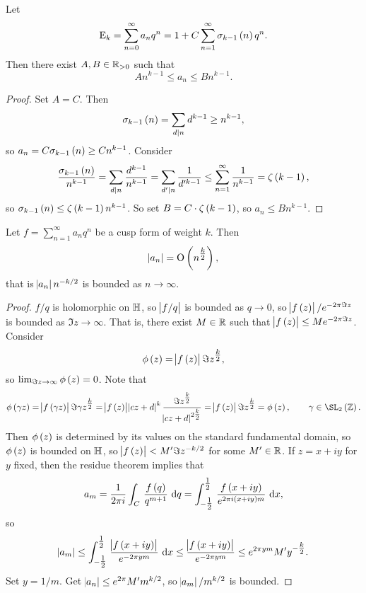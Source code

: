 \begin{proposition}
Let
$$ \E_k = \sum_{n = 0}^\infty a_nq^n = 1 + C\sum_{n = 1}^\infty \sigma_{k - 1}\br{n}q^n. $$
Then there exist $ A, B \in \mathbb{R}_{> 0} $ such that
$$ An^{k - 1} \le a_n \le Bn^{k - 1}. $$
\end{proposition}

\begin{proof}
Set $ A = C $. Then
$$ \sigma_{k - 1}\br{n} = \sum_{d \mid n} d^{k - 1} \ge n^{k - 1}, $$
so $ a_n = C\sigma_{k - 1}\br{n} \ge Cn^{k - 1} $. Consider
$$ \dfrac{\sigma_{k - 1}\br{n}}{n^{k - 1}} = \sum_{d \mid n} \dfrac{d^{k - 1}}{n^{k - 1}} = \sum_{d' \mid n} \dfrac{1}{d'^{k - 1}} \le \sum_{n = 1}^\infty \dfrac{1}{n^{k - 1}} = \zeta\br{k - 1}, $$
so $ \sigma_{k - 1}\br{n} \le \zeta\br{k - 1}n^{k - 1} $. So set $ B = C \cdot \zeta\br{k - 1} $, so $ a_n \le Bn^{k - 1} $.
\end{proof}

\begin{theorem}[Hasse]
Let $ f = \sum_{n = 1}^\infty a_nq^n $ be a cusp form of weight $ k $. Then
$$ \abs{a_n} = \O\br{n^{\tfrac{k}{2}}}, $$
that is $ \abs{a_n}n^{-k / 2} $ is bounded as $ n \to \infty $.
\end{theorem}

\pagebreak

\begin{proof}
$ f / q $ is holomorphic on $ \mathbb{H} $, so $ \abs{f / q} $ is bounded as $ q \to 0 $, so $ \abs{f\br{z}} / e^{-2\pi \Im z} $ is bounded as $ \Im z \to \infty $. That is, there exist $ M \in \mathbb{R} $ such that $ \abs{f\br{z}} \le Me^{-2\pi \Im z} $. Consider
$$ \phi\br{z} = \abs{f\br{z}}\Im z^{\tfrac{k}{2}}, $$
so $ \lim_{\Im z \to \infty} \phi\br{z} = 0 $. Note that
$$ \phi\br{\gamma z} = \abs{f\br{\gamma z}}\Im \gamma z^{\tfrac{k}{2}} = \abs{f\br{z}}\abs{cz + d}^k\dfrac{\Im z^{\tfrac{k}{2}}}{\abs{cz + d}^{2\tfrac{k}{2}}} = \abs{f\br{z}}\Im z^{\tfrac{k}{2}} = \phi\br{z}, \qquad \gamma \in \SL_2\br{\ZZ}. $$
Then $ \phi\br{z} $ is determined by its values on the standard fundamental domain, so $ \phi\br{z} $ is bounded on $ \mathbb{H} $, so $ \abs{f\br{z}} < M'\Im z^{-k / 2} $ for some $ M' \in \mathbb{R} $. If $ z = x + iy $ for $ y $ fixed, then the residue theorem implies that
$$ a_m = \dfrac{1}{2\pi i}\intd{C}{}{\dfrac{f\br{q}}{q^{m + 1}}}{q} = \intd{-\tfrac{1}{2}}{\tfrac{1}{2}}{\dfrac{f\br{x + iy}}{e^{2\pi i\br{x + iy}m}}}{x}, $$
so
$$ \abs{a_m} \le \intd{-\tfrac{1}{2}}{\tfrac{1}{2}}{\dfrac{\abs{f\br{x + iy}}}{e^{-2\pi ym}}}{x} \le \dfrac{\abs{f\br{x + iy}}}{e^{-2\pi ym}} \le e^{2\pi ym}M'y^{-\tfrac{k}{2}}. $$
Set $ y = 1 / m $. Get $ \abs{a_n} \le e^{2\pi}M'm^{k / 2} $, so $ \abs{a_m} / m^{k / 2} $ is bounded.
\end{proof}

